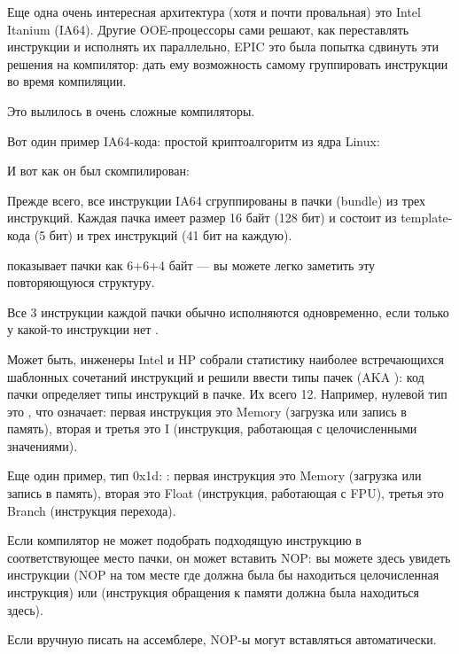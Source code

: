 \label{itanium}
Еще одна очень интересная архитектура (хотя и почти провальная) это Intel Itanium (\ac{IA64}).
Другие \ac{OOE}-процессоры сами решают, как переставлять инструкции и исполнять их параллельно,
\ac{EPIC} это была попытка сдвинуть эти решения на компилятор: дать ему возможность самому 
группировать инструкции во время компиляции.

Это вылилось в очень сложные компиляторы.

Вот один пример \ac{IA64}-кода: простой криптоалгоритм из ядра Linux:



И вот как он был скомпилирован:



Прежде всего, все инструкции \ac{IA64} сгруппированы в пачки (bundle) из трех инструкций.
Каждая пачка имеет размер 16 байт (128 бит) и состоит из template-кода (5 бит) и трех инструкций (41 бит на каждую).

\IDA показывает пачки как 6+6+4 байт --- вы можете легко заметить эту повторяющуюся структуру.

Все 3 инструкции каждой пачки обычно исполняются одновременно, если только у какой-то инструкции
нет .

Может быть, инженеры Intel и HP собрали статистику наиболее встречающихся шаблонных сочетаний
инструкций и решили ввести типы пачек (\ac{AKA} ): код пачки определяет типы инструкций
в пачке.
Их всего 12.
Например, нулевой тип это , что означает: первая инструкция это Memory (загрузка
или запись в память), вторая и третья это I (инструкция, работающая с целочисленными значениями).

Еще один пример, тип 0x1d: : первая инструкция это Memory (загрузка или запись
в память), вторая это Float (инструкция, работающая с \ac{FPU}), третья это Branch (инструкция
перехода).

Если компилятор не может подобрать подходящую инструкцию в соответствующее место пачки,
он может вставить \ac{NOP}:
вы можете здесь увидеть инструкции  (\ac{NOP} на том месте где должна была бы находиться
целочисленная инструкция) или  (инструкция обращения к памяти должна была находиться
здесь).

Если вручную писать на ассемблере, \ac{NOP}-ы могут вставляться автоматически.


